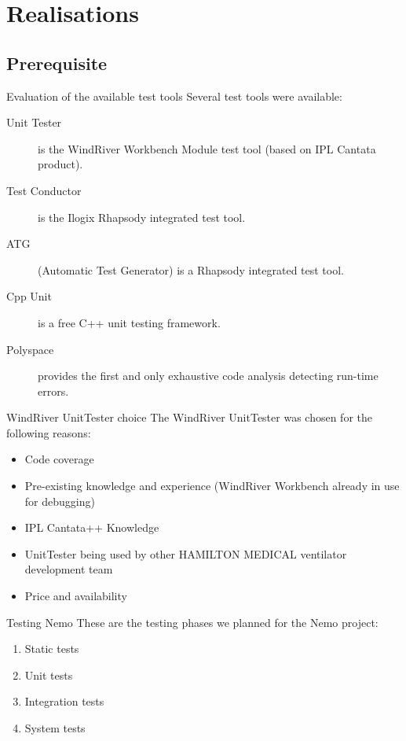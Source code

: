 \documentclass{beamer}
\begin{document}
\section{Realisations}

\subsection{Prerequisite}
\begin{frame}{Evaluation of the available test tools}
Several test tools were available:
\begin{description}
  \item[Unit Tester] is the WindRiver Workbench Module test tool (based on IPL Cantata product).
  \item[Test Conductor] is the Ilogix Rhapsody integrated test tool.
  \item[ATG] (Automatic Test Generator) is a Rhapsody integrated test tool.
  \item[Cpp Unit] is a free C++ unit testing framework.
  \item[Polyspace] provides the first and only exhaustive code analysis detecting run-time errors.
\end{description}
\end{frame}

\begin{frame}{WindRiver UnitTester choice}
The WindRiver UnitTester was chosen for the following reasons:
\begin{itemize}
\item<1-> Code coverage
\item<2-> Pre-existing knowledge and experience (WindRiver Workbench already in
use for debugging)
\item<3-> IPL Cantata++ Knowledge
\item<4-> UnitTester being used by other HAMILTON MEDICAL ventilator development
team
\item<5-> Price and availability
\end{itemize}
\end{frame}

\begin{frame}{Testing Nemo}
These are the testing phases we planned for the Nemo project:
\begin{enumerate}
\item Static tests
\item Unit tests
\item Integration tests
\item System tests
\end{enumerate}
\end{frame}
\end{document}
